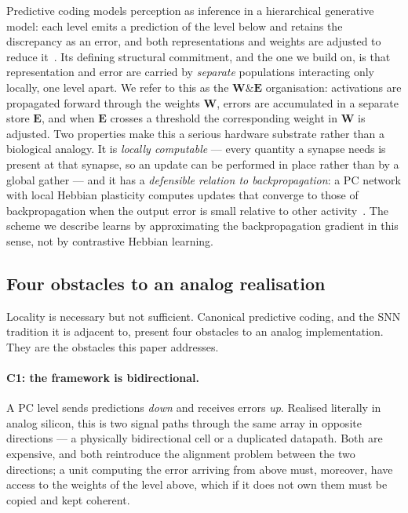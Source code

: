 \documentclass[11pt]{article}
\newcommand{\W}{\bm W}
\newcommand{\E}{\bm E}
\begin{document}
Predictive coding models perception as inference in a hierarchical generative model: each level emits
a prediction of the level below and retains the discrepancy as an error, and both representations and
weights are adjusted to reduce it~\cite{rao1999predictive,bogacz2017tutorial}. Its defining structural
commitment, and the one we build on, is that representation and error are carried by \emph{separate}
populations interacting only locally, one level apart. We refer to this as the $\W\&\E$ organisation:
activations are propagated forward through the weights $\W$, errors are accumulated in a separate
store $\E$, and when $\E$ crosses a threshold the corresponding weight in $\W$ is adjusted. Two
properties make this a serious hardware substrate rather than a biological analogy. It is
\emph{locally computable} --- every quantity a synapse needs is present at that synapse, so an update
can be performed in place rather than by a global gather --- and it has a \emph{defensible relation to
backpropagation}: a PC network with local Hebbian plasticity computes updates that converge to those
of backpropagation when the output error is small relative to other
activity~\cite{whittington2017approximation}. The scheme we describe learns by approximating the
backpropagation gradient in this sense, not by contrastive Hebbian learning.

\subsection{Four obstacles to an analog realisation}\label{sec:pc-challenges}

Locality is necessary but not sufficient. Canonical predictive coding, and the SNN tradition it is
adjacent to, present four obstacles to an analog implementation. They are the obstacles this paper
addresses.

\paragraph{C1: the framework is bidirectional.} A PC level sends predictions \emph{down} and receives
errors \emph{up}. Realised literally in analog silicon, this is two signal paths through the same
array in opposite directions --- a physically bidirectional cell or a duplicated datapath. Both are
expensive, and both reintroduce the alignment problem between the two directions; a unit computing the
error arriving from above must, moreover, have access to the weights of the level above, which if it
does not own them must be copied and kept coherent.
\end{document}
